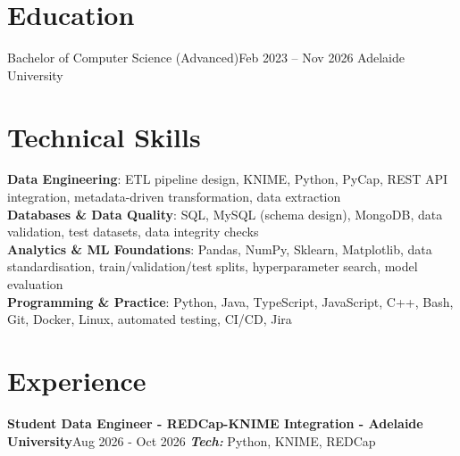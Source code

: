 \documentclass[letterpaper,11pt]{article}
\begin{document}
\resumeHeader

\section{Education}
  \resumeSubHeadingListStart
    \resumeSubheading
      {Bachelor of Computer Science (Advanced)}{\small Feb 2023 -- Nov 2026}
      {Adelaide University}{}
  \resumeSubHeadingListEnd


\section{Technical Skills}
 \begin{itemize}[leftmargin=0.15in, label={}]
    \small{\item{
     \textbf{Data Engineering}{: ETL pipeline design, KNIME, Python, PyCap, REST API integration, metadata-driven transformation, data extraction} \\
     \textbf{Databases \& Data Quality}{: SQL, MySQL (schema design), MongoDB, data validation, test datasets, data integrity checks} \\
     \textbf{Analytics \& ML Foundations}{: Pandas, NumPy, Sklearn, Matplotlib, data standardisation, train/validation/test splits, hyperparameter search, model evaluation} \\
     \textbf{Programming \& Practice}{: Python, Java, TypeScript, JavaScript, C++, Bash, Git, Docker, Linux, automated testing, CI/CD, Jira} \\
    }}
 \end{itemize}


\section{Experience}
  \resumeSubHeadingListStart

  \resumeSubheading
         {\textbf{{Student Data Engineer - REDCap-KNIME Integration - Adelaide University}}}{\small Aug 2026 - Oct 2026}
         {\emph{\textbf{Tech:}} Python, KNIME, REDCap}{}
         \resumeItemListStart
         \resumeItemListEnd
\end{document}
